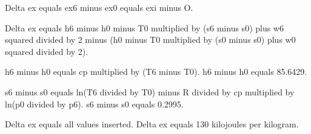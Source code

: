 Delta ex equals ex6 minus ex0 equals exi minus O.  

Delta ex equals h6 minus h0 minus T0 multiplied by (s6 minus s0) plus w6 squared divided by 2 minus (h0 minus T0 multiplied by (s0 minus s0) plus w0 squared divided by 2).  

h6 minus h0 equals cp multiplied by (T6 minus T0).  
h6 minus h0 equals 85.6429.  

s6 minus s0 equals ln(T6 divided by T0) minus R divided by cp multiplied by ln(p0 divided by p6).  
s6 minus s0 equals 0.2995.  

Delta ex equals all values inserted.  
Delta ex equals 130 kilojoules per kilogram.
